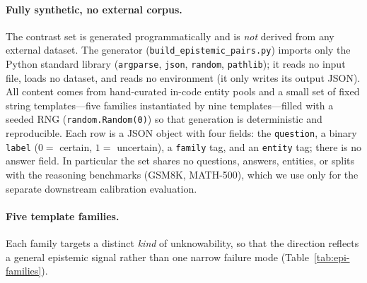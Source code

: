\paragraph{Fully synthetic, no external corpus.}
The contrast set is generated programmatically and is \emph{not} derived from any external
dataset. The generator (\texttt{build\_epistemic\_pairs.py}) imports only the Python
standard library (\texttt{argparse}, \texttt{json}, \texttt{random}, \texttt{pathlib}); it
reads no input file, loads no dataset, and reads no environment (it only writes its output
JSON). All content comes from hand-curated in-code entity pools and a small set of fixed
string templates---five families instantiated by nine templates---filled with a seeded RNG
(\texttt{random.Random(0)}) so that generation is deterministic and reproducible. Each row
is a JSON object with four fields: the \texttt{question}, a binary \texttt{label}
($0=$ certain, $1=$ uncertain), a \texttt{family} tag, and an \texttt{entity} tag; there is
no answer field. In particular the set shares no questions, answers, entities, or splits
with the reasoning benchmarks (GSM8K, MATH-500), which we use only for the separate
downstream calibration evaluation.

\paragraph{Five template families.}
Each family targets a distinct \emph{kind} of unknowability, so that the direction reflects
a general epistemic signal rather than one narrow failure mode
(Table~\ref{tab:epi-families}).

